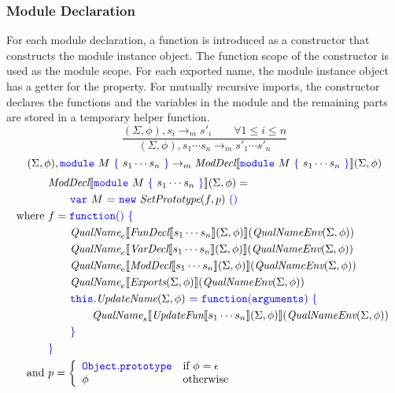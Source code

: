 \documentclass[a4paper]{article}
\newcommand{\code}[1]{\textcolor{blue}{\tt #1}}
\newcommand{\If}{\mbox{if}}
\newcommand{\Otherwise}{\mbox{otherwise}}
\newcommand{\Where}{\mbox{where}}
\newcommand{\UpdateName}{\emph{UpdateName}}
\newcommand{\FunDecl}{\emph{FunDecl}}
\newcommand{\VarDecl}{\emph{VarDecl}}
\newcommand{\Exports}{\emph{Exports}}
\newcommand{\ModDecl}{\emph{ModDecl}}
\newcommand{\UpdateFun}{\emph{UpdateFun}}
\newcommand{\QualName}{\emph{QualName}}
\newcommand{\QualNameEnv}{\emph{QualNameEnv}}
\newcommand{\SetPrototype}{\emph{SetPrototype}}
\begin{document}
\subsubsection{Module Declaration}
For each module declaration, a function is introduced as a constructor that constructs the module instance object.
The function scope of the constructor is used as the module scope.
For each exported name, the module instance object has a getter for the property.
For mutually recursive imports, the constructor declares the functions and the variables in the module and the remaining parts are stored in a temporary helper function.
\begin{equation*}
\frac{(\Sigma, \phi), s_i \rightarrow_m s'_i \qquad\forall 1 \le i \le n}{(\Sigma, \phi), s_1 \cdots s_n \rightarrow_m s'_1 \cdots s'_n}
\end{equation*}
\begin{equation*}
(\Sigma, \phi), \code{module}\ M\ \code{\{}\ s_1 \cdots s_n\ \code{\}} \rightarrow_m \ModDecl \llbracket \code{module}\ M\ \code{\{}\ s_1 \cdots s_n\ \code{\}} \rrbracket (\Sigma, \phi)
\end{equation*}
\begin{equation*}
\begin{split}
&\ModDecl \llbracket \code{module}\ M\ \code{\{}\ s_1 \cdots s_n\ \code{\}} \rrbracket (\Sigma, \phi) = \\
&\qquad \code{var}\ M\ \code{=}\ \code{new}\ \SetPrototype (f, p)\ \code{()} \\
\Where\ & f = \code{function()}\ \code{\{} \\
&\qquad \QualName_e \llbracket \FunDecl \llbracket s_1 \cdots s_n \rrbracket (\Sigma, \phi) \rrbracket (\QualNameEnv(\Sigma, \phi)) \\
&\qquad \QualName_e \llbracket \VarDecl \llbracket s_1 \cdots s_n \rrbracket (\Sigma, \phi) \rrbracket (\QualNameEnv(\Sigma, \phi)) \\
&\qquad \QualName_e \llbracket \ModDecl \llbracket s_1 \cdots s_n \rrbracket (\Sigma, \phi) \rrbracket (\QualNameEnv(\Sigma, \phi)) \\
&\qquad \QualName_e \llbracket \Exports (\Sigma, \phi) \rrbracket (\QualNameEnv(\Sigma, \phi)) \\
&\qquad \code{this.}\UpdateName (\Sigma, \phi)\ \code{=}\ \code{function(arguments)}\ \code{\{}\ \\
&\qquad\qquad \QualName_s \llbracket \UpdateFun \llbracket s_1 \cdots s_n \rrbracket (\Sigma, \phi) \rrbracket (\QualNameEnv(\Sigma, \phi))\ \\
&\qquad \code{\}} \\
&\code{\}} \\
\mbox{and}\ & p = \left\{\begin{array}{ll}
\code{Object.prototype} & \If\ \phi = \epsilon \\
\phi & \Otherwise
\end{array}\right.
\end{split}
\end{equation*}
\end{document}
